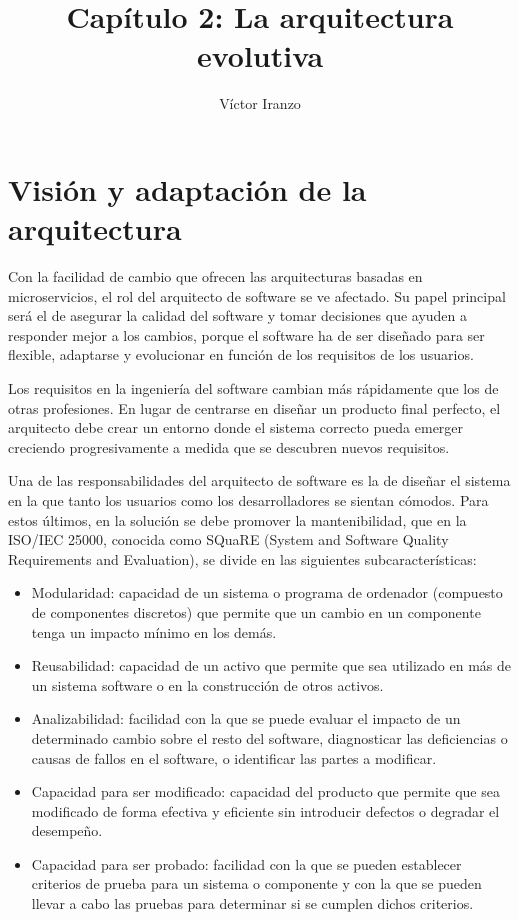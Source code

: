 \documentclass[11pt,a4paper]{article}
\author{Víctor Iranzo}
\title{Capítulo 2: La arquitectura evolutiva}
\begin{document}
\maketitle

\section{Visión y adaptación de la arquitectura}

Con la facilidad de cambio que ofrecen las arquitecturas basadas en microservicios, el rol del arquitecto de software se ve afectado. Su papel principal será el de asegurar la calidad del software y tomar decisiones que ayuden a responder mejor a los cambios, porque el software ha de ser diseñado para ser flexible, adaptarse y evolucionar en función de los requisitos de los usuarios.

Los requisitos en la ingeniería del software cambian más rápidamente que los de otras profesiones. En lugar de centrarse en diseñar un producto final perfecto, el arquitecto debe crear un entorno donde el sistema correcto pueda emerger creciendo progresivamente a medida que se descubren nuevos requisitos.

Una de las responsabilidades del arquitecto de software es la de diseñar el sistema en la que tanto los usuarios como los desarrolladores se sientan cómodos. Para estos últimos, en la solución se debe promover la mantenibilidad, que en la ISO/IEC 25000, conocida como SQuaRE (System and Software Quality Requirements and Evaluation), se divide en las siguientes subcaracterísticas:

\begin{itemize}

\item Modularidad: capacidad de un sistema o programa de ordenador (compuesto de componentes discretos) que permite que un cambio en un componente tenga un impacto mínimo en los demás.

\item Reusabilidad: capacidad de un activo que permite que sea utilizado en más de un sistema software o en la construcción de otros activos.

\item Analizabilidad: facilidad con la que se puede evaluar el impacto de un determinado cambio sobre el resto del software, diagnosticar las deficiencias o causas de fallos en el software, o identificar las partes a modificar.

\item Capacidad para ser modificado: capacidad del producto que permite que sea modificado de forma efectiva y eficiente sin introducir defectos o degradar el desempeño.

\item Capacidad para ser probado: facilidad con la que se pueden establecer criterios de prueba para un sistema o componente y con la que se pueden llevar a cabo las pruebas para determinar si se cumplen dichos criterios.

\end{itemize}
\end{document}
